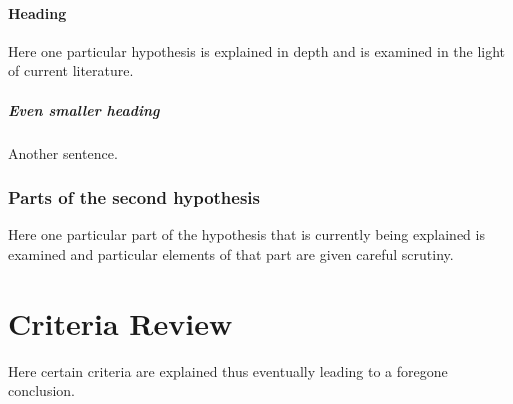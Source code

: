 \paragraph{Heading} Here one particular hypothesis is explained in depth
and is examined in the light of current literature. \subparagraph{Even smaller heading} Another sentence.

\subsubsection{Parts of the second hypothesis}

Here one particular part of the hypothesis that is
currently being explained is examined and particular
elements of that part are given careful scrutiny.

\section{Criteria Review}

Here certain criteria are explained thus eventually
leading to a foregone conclusion.
